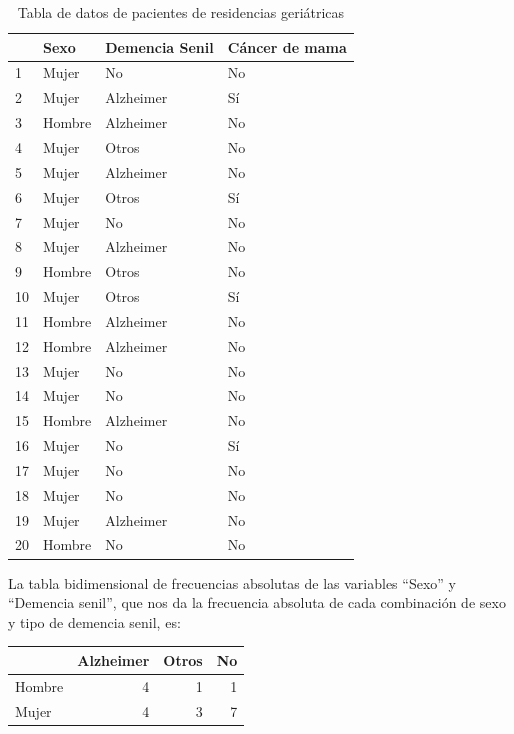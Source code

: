 \documentclass[
]{book}
\theoremstyle{definition}
\theoremstyle{definition}
\theoremstyle{definition}
\theoremstyle{definition}
\theoremstyle{remark}
\begin{document}
\begin{table}

\caption{\label{tab:tablager2}Tabla de datos de pacientes de residencias geriátricas}
\centering
\begin{tabular}[t]{l|l|l|l}
\hline
  & Sexo & Demencia Senil & Cáncer de mama\\
\hline
1 & Mujer & No & No\\
\hline
2 & Mujer & Alzheimer & Sí\\
\hline
3 & Hombre & Alzheimer & No\\
\hline
4 & Mujer & Otros & No\\
\hline
5 & Mujer & Alzheimer & No\\
\hline
6 & Mujer & Otros & Sí\\
\hline
7 & Mujer & No & No\\
\hline
8 & Mujer & Alzheimer & No\\
\hline
9 & Hombre & Otros & No\\
\hline
10 & Mujer & Otros & Sí\\
\hline
11 & Hombre & Alzheimer & No\\
\hline
12 & Hombre & Alzheimer & No\\
\hline
13 & Mujer & No & No\\
\hline
14 & Mujer & No & No\\
\hline
15 & Hombre & Alzheimer & No\\
\hline
16 & Mujer & No & Sí\\
\hline
17 & Mujer & No & No\\
\hline
18 & Mujer & No & No\\
\hline
19 & Mujer & Alzheimer & No\\
\hline
20 & Hombre & No & No\\
\hline
\end{tabular}
\end{table}

La tabla bidimensional de frecuencias absolutas de las variables ``Sexo'' y ``Demencia senil'', que nos da la frecuencia absoluta de cada combinación de sexo y tipo de demencia senil, es:

\begin{table}
\centering
\begin{tabular}{l|r|r|r}
\hline
  & Alzheimer & Otros & No\\
\hline
Hombre & 4 & 1 & 1\\
\hline
Mujer & 4 & 3 & 7\\
\hline
\end{tabular}
\end{table}
\end{document}
